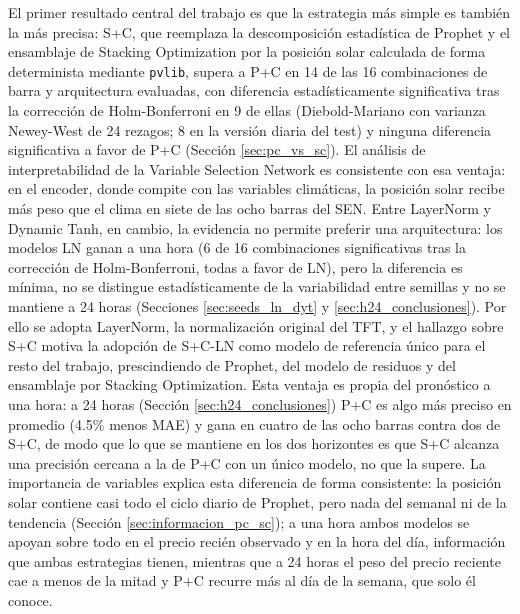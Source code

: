 El primer resultado central del trabajo es que la estrategia más simple es también la más precisa: S+C, que reemplaza la descomposición estadística de Prophet y el ensamblaje de Stacking Optimization por la posición solar calculada de forma determinista mediante \texttt{pvlib}, supera a P+C en 14 de las 16 combinaciones de barra y arquitectura evaluadas, con diferencia estadísticamente significativa tras la corrección de Holm-Bonferroni en 9 de ellas (Diebold-Mariano con varianza Newey-West de 24 rezagos; 8 en la versión diaria del test) y ninguna diferencia significativa a favor de P+C (Sección \ref{sec:pc_vs_sc}). El análisis de interpretabilidad de la Variable Selection Network es consistente con esa ventaja: en el encoder, donde compite con las variables climáticas, la posición solar recibe más peso que el clima en siete de las ocho barras del SEN. Entre LayerNorm y Dynamic Tanh, en cambio, la evidencia no permite preferir una arquitectura: los modelos LN ganan a una hora (6 de 16 combinaciones significativas tras la corrección de Holm-Bonferroni, todas a favor de LN), pero la diferencia es mínima, no se distingue estadísticamente de la variabilidad entre semillas y no se mantiene a 24 horas (Secciones \ref{sec:seeds_ln_dyt} y \ref{sec:h24_conclusiones}). Por ello se adopta LayerNorm, la normalización original del TFT, y el hallazgo sobre S+C motiva la adopción de S+C-LN como modelo de referencia único para el resto del trabajo, prescindiendo de Prophet, del modelo de residuos y del ensamblaje por Stacking Optimization. Esta ventaja es propia del pronóstico a una hora: a 24 horas (Sección \ref{sec:h24_conclusiones}) P+C es algo más preciso en promedio (4.5\% menos MAE) y gana en cuatro de las ocho barras contra dos de S+C, de modo que lo que se mantiene en los dos horizontes es que S+C alcanza una precisión cercana a la de P+C con un único modelo, no que la supere. La importancia de variables explica esta diferencia de forma consistente: la posición solar contiene casi todo el ciclo diario de Prophet, pero nada del semanal ni de la tendencia (Sección \ref{sec:informacion_pc_sc}); a una hora ambos modelos se apoyan sobre todo en el precio recién observado y en la hora del día, información que ambas estrategias tienen, mientras que a 24 horas el peso del precio reciente cae a menos de la mitad y P+C recurre más al día de la semana, que solo él conoce.


